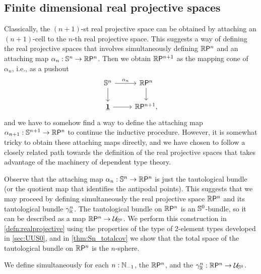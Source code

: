\subsection{Finite dimensional real projective spaces}
\label{sec:fdrp}

Classically, the $(n+1)$-st real projective space can be obtained by attaching an $(n+1)$-cell to the $n$-th real projective space. This suggests a way of defining the real projective spaces that involves simultaneously defining $\rprojective{n}$ and an attaching map $\alpha_n : \sphere{n}\to\rprojective{n}$. Then we obtain $\rprojective{n+1}$ as the mapping cone of $\alpha_n$, i.e., as a pushout
\begin{equation*}
\begin{tikzcd}
\sphere{n} \arrow[r,"\alpha_n"] \arrow[d] & \rprojective{n} \arrow[d] \\
\unit \arrow[r] & \rprojective{n+1},
\end{tikzcd}
\end{equation*}
and we have to somehow find a way to define the attaching map $\alpha_{n+1}:\sphere{n+1}\to\rprojective{n}$ to continue the inductive procedure.
However, it is somewhat tricky to obtain these attaching maps directly, and we have chosen to follow a closely related path towards the definition of the real projective spaces that takes advantage of the machinery of dependent type theory. 

Observe that the attaching map $\alpha_n:\sphere{n}\to\rprojective{n}$ is just the tautological bundle (or the quotient map that identifies the antipodal points). This suggests that we may proceed by defining simultaneously the real projective space $\rprojective{n}$ and its tautological bundle $\tautfam[\R]{n}$. The tautological bundle on $\rprojective{n}$ is an $\sphere{0}$-bundle, so it can be described as a map $\rprojective{n}\to\UU_{\sphere{0}}$. We perform this construction in \autoref{defn:realprojective} using the properties of the type of 2-element types developed in \autoref{sec:UUS0}, and in \autoref{thm:Sn_totalcov} we show that the total space of the tautological bundle on $\rprojective{n}$ is the $n$-sphere. 

\begin{defn}\label{defn:realprojective}
We define simultaneously for each $n:\N_{-1}$, 
the  $\rprojective{n}$, 
and the  $\tautfam[\R]{n}:\rprojective{n}\to \UU_{\sphere{0}}$.
\end{defn}


